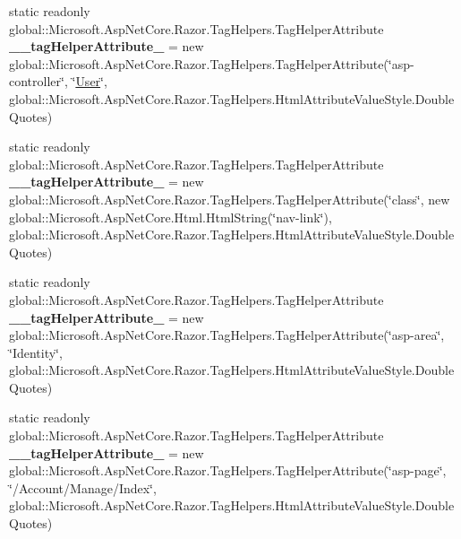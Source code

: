\begin{DoxyCompactItemize}
\item 
\mbox{\label{class_asp_net_core_1_1_views___shared____sidebar_aa95b66fc9dff8b426d1e73a6b1998075}} 
static readonly global\+::\+Microsoft.\+Asp\+Net\+Core.\+Razor.\+Tag\+Helpers.\+Tag\+Helper\+Attribute {\bfseries \+\_\+\+\_\+tag\+Helper\+Attribute\+\_} = new global\+::\+Microsoft.\+Asp\+Net\+Core.\+Razor.\+Tag\+Helpers.\+Tag\+Helper\+Attribute(\char`\"{}asp-\/controller\char`\"{}, \char`\"{}\mbox{\hyperlink{class_projeto_e_s_w_1_1_models_1_1_user}{User}}\char`\"{}, global\+::\+Microsoft.\+Asp\+Net\+Core.\+Razor.\+Tag\+Helpers.\+Html\+Attribute\+Value\+Style.\+Double\+Quotes)
\item 
\mbox{\label{class_asp_net_core_1_1_views___shared____sidebar_a042179117a8cbe17b4bdb984354b0713}} 
static readonly global\+::\+Microsoft.\+Asp\+Net\+Core.\+Razor.\+Tag\+Helpers.\+Tag\+Helper\+Attribute {\bfseries \+\_\+\+\_\+tag\+Helper\+Attribute\+\_} = new global\+::\+Microsoft.\+Asp\+Net\+Core.\+Razor.\+Tag\+Helpers.\+Tag\+Helper\+Attribute(\char`\"{}class\char`\"{}, new global\+::\+Microsoft.\+Asp\+Net\+Core.\+Html.\+Html\+String(\char`\"{}nav-\/link\char`\"{}), global\+::\+Microsoft.\+Asp\+Net\+Core.\+Razor.\+Tag\+Helpers.\+Html\+Attribute\+Value\+Style.\+Double\+Quotes)
\item 
\mbox{\label{class_asp_net_core_1_1_views___shared____sidebar_a8c2f05382b8155cad44a3b261abe1d34}} 
static readonly global\+::\+Microsoft.\+Asp\+Net\+Core.\+Razor.\+Tag\+Helpers.\+Tag\+Helper\+Attribute {\bfseries \+\_\+\+\_\+tag\+Helper\+Attribute\+\_} = new global\+::\+Microsoft.\+Asp\+Net\+Core.\+Razor.\+Tag\+Helpers.\+Tag\+Helper\+Attribute(\char`\"{}asp-\/area\char`\"{}, \char`\"{}Identity\char`\"{}, global\+::\+Microsoft.\+Asp\+Net\+Core.\+Razor.\+Tag\+Helpers.\+Html\+Attribute\+Value\+Style.\+Double\+Quotes)
\item 
\mbox{\label{class_asp_net_core_1_1_views___shared____sidebar_ac9c7716f3e61889419428d7e09af3013}} 
static readonly global\+::\+Microsoft.\+Asp\+Net\+Core.\+Razor.\+Tag\+Helpers.\+Tag\+Helper\+Attribute {\bfseries \+\_\+\+\_\+tag\+Helper\+Attribute\+\_} = new global\+::\+Microsoft.\+Asp\+Net\+Core.\+Razor.\+Tag\+Helpers.\+Tag\+Helper\+Attribute(\char`\"{}asp-\/page\char`\"{}, \char`\"{}/Account/Manage/Index\char`\"{}, global\+::\+Microsoft.\+Asp\+Net\+Core.\+Razor.\+Tag\+Helpers.\+Html\+Attribute\+Value\+Style.\+Double\+Quotes)

\end{DoxyCompactItemize}
